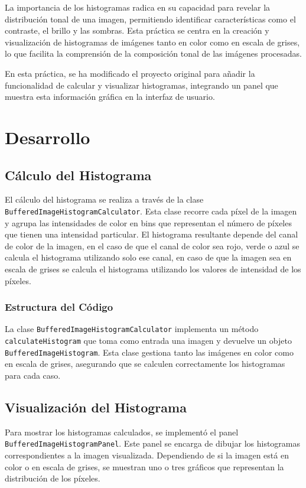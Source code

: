 \documentclass{report}
\begin{document}
  La importancia de los histogramas radica en su capacidad para revelar la distribución tonal de una imagen, permitiendo identificar características como el contraste, el brillo y las sombras.
  Esta práctica se centra en la creación y visualización de histogramas de imágenes tanto en color como en escala de grises, lo que facilita la comprensión de la composición tonal de las imágenes procesadas.

  En esta práctica, se ha modificado el proyecto original para añadir la funcionalidad de calcular y visualizar histogramas, integrando un panel que muestra esta información gráfica en la interfaz de usuario.


  \chapter{Desarrollo}\label{ch:desarrollo}


  \section{Cálculo del Histograma}\label{sec:calculo-del-histograma}
  El cálculo del histograma se realiza a través de la clase \texttt{BufferedImageHistogramCalculator}.
  Esta clase recorre cada píxel de la imagen y agrupa las intensidades de color en bins que representan el número de píxeles que tienen una intensidad particular.
  El histograma resultante depende del canal de color de la imagen, en el caso de que el canal de color sea rojo, verde o azul se calcula el histograma utilizando solo ese canal, en caso de que la imagen sea en escala de grises se calcula el histograma utilizando los valores de intensidad de los píxeles.

  \subsection{Estructura del Código}\label{subsec:estructura-del-codigo}
  La clase \texttt{BufferedImageHistogramCalculator} implementa un método \texttt{calculateHistogram} que toma como entrada una imagen y devuelve un objeto \texttt{BufferedImageHistogram}.
  Esta clase gestiona tanto las imágenes en color como en escala de grises, asegurando que se calculen correctamente los histogramas para cada caso.


  \section{Visualización del Histograma}\label{sec:visualizacion-del-histograma}
  Para mostrar los histogramas calculados, se implementó el panel \texttt{BufferedImageHistogramPanel}.
  Este panel se encarga de dibujar los histogramas correspondientes a la imagen visualizada.
  Dependiendo de si la imagen está en color o en escala de grises, se muestran uno o tres gráficos que representan la distribución de los píxeles.
\end{document}
